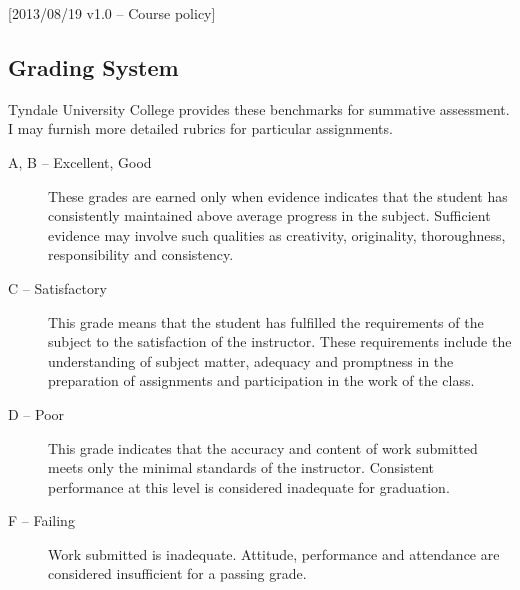 [2013/08/19 v1.0 -- Course policy]

\subsection{Grading System}
\label{grades}

Tyndale University College provides these benchmarks for summative assessment.
I may furnish more detailed rubrics for particular assignments.


\begin{description}
  \item[A, B -- Excellent, Good]
    These grades are earned only when evidence indicates that the student
    has consistently maintained above average progress in the subject.
    Sufficient evidence may involve such qualities as creativity, originality,
    thoroughness, responsibility and consistency.
  \item[C -- Satisfactory]
    This grade means that the student has fulfilled the requirements of the
    subject to the satisfaction of the instructor. These requirements include
    the understanding of subject matter, adequacy and promptness in the
    preparation of assignments and participation in the work of the class.
  \item[D -- Poor]
    This grade indicates that the accuracy and content of work submitted meets
    only the minimal standards of the instructor. Consistent performance at
    this level is considered inadequate for graduation.
  \item[F -- Failing]
    Work submitted is inadequate. Attitude, performance and attendance are
    considered insufficient for a passing grade.
\end{description}

